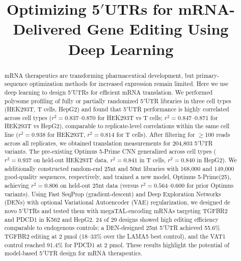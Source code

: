 \documentclass[11pt]{article}
\title{Optimizing 5$'$UTRs for mRNA-Delivered Gene Editing Using Deep Learning}
\author{}
\date{}
\begin{document}
\maketitle

\begin{abstract}
mRNA therapeutics are transforming pharmaceutical development, but primary-sequence optimization methods for increased expression remain limited. Here we use deep learning to design 5$'$UTRs for efficient mRNA translation. We performed polysome profiling of fully or partially randomized 5$'$UTR libraries in three cell types (HEK293T, T cells, HepG2) and found that 5$'$UTR performance is highly correlated across cell types ($r^2 = 0.837$--$0.870$ for HEK293T vs T cells; $r^2 = 0.847$--$0.871$ for HEK293T vs HepG2), comparable to replicate-level correlations within the same cell line ($r^2 = 0.938$ for HEK293T, $r^2 = 0.814$ for T cells). After filtering for $\geq$100 reads across all replicates, we obtained translation measurements for 204{,}803 5$'$UTR variants. The pre-existing Optimus 5-Prime CNN generalized across cell types ($r^2 = 0.937$ on held-out HEK293T data, $r^2 = 0.841$ in T cells, $r^2 = 0.840$ in HepG2). We additionally constructed random-end 25nt and 50nt libraries with 168{,}000 and 149{,}000 good-quality sequences, respectively, and trained a new model, Optimus 5-Prime(25), achieving $r^2 = 0.806$ on held-out 25nt data (versus $r^2 = 0.564$--$0.600$ for prior Optimus variants). Using Fast SeqProp (gradient-descent) and Deep Exploration Networks (DENs) with optional Variational Autoencoder (VAE) regularization, we designed de novo 5$'$UTRs and tested them with megaTAL-encoding mRNAs targeting TGFBR2 and PDCD1 in K562 and HepG2. 24 of 29 designs showed high editing efficiency comparable to endogenous controls; a DEN-designed 25nt 5$'$UTR achieved 55.6\% TGFBR2 editing at 2 pmol (18--33\% over the LAMA5 best control), and the VAT1 control reached 91.4\% for PDCD1 at 2 pmol. These results highlight the potential of model-based 5$'$UTR design for mRNA therapeutics.
\end{abstract}
\end{document}
